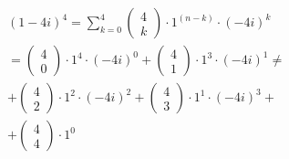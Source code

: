 \[
\begin{aligned}
&(1-4 i)^{4}=\sum_{k=0}^{4}\left(\begin{array}{l}
4 \\
k
\end{array}\right) \cdot 1^{(n-k)} \cdot(-4 i)^{k} \\
&=\left(\begin{array}{l}
4 \\
0
\end{array}\right) \cdot 1^{4} \cdot(-4 i)^{0}+\left(\begin{array}{l}
4 \\
1
\end{array}\right) \cdot 1^{3} \cdot(-4 i)^{1} \neq \\
&+\left(\begin{array}{l}
4 \\
2
\end{array}\right) \cdot 1^{2} \cdot(-4 i)^{2}+\left(\begin{array}{l}
4 \\
3
\end{array}\right) \cdot 1^{1} \cdot(-4 i)^{3}+ \\
&+\left(\begin{array}{l}
4 \\
4
\end{array}\right) \cdot 1^{0}
\end{aligned}
\]

